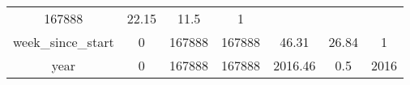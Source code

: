 \documentclass[]{book}
\theoremstyle{definition}
\theoremstyle{definition}
\theoremstyle{definition}
\theoremstyle{remark}
\begin{document}
\begin{longtable}[]{@{}ccccccc@{}}
\begin{minipage}[t]{0.10\columnwidth}
167888\strut
\end{minipage} & \begin{minipage}[t]{0.11\columnwidth}\centering\strut
22.15\strut
\end{minipage} & \begin{minipage}[t]{0.09\columnwidth}\centering\strut
11.5\strut
\end{minipage} & \begin{minipage}[t]{0.09\columnwidth}\centering\strut
1\strut
\end{minipage}\tabularnewline
\begin{minipage}[t]{0.20\columnwidth}\centering\strut
week\_since\_start\strut
\end{minipage} & \begin{minipage}[t]{0.11\columnwidth}\centering\strut
0\strut
\end{minipage} & \begin{minipage}[t]{0.12\columnwidth}\centering\strut
167888\strut
\end{minipage} & \begin{minipage}[t]{0.10\columnwidth}\centering\strut
167888\strut
\end{minipage} & \begin{minipage}[t]{0.11\columnwidth}\centering\strut
46.31\strut
\end{minipage} & \begin{minipage}[t]{0.09\columnwidth}\centering\strut
26.84\strut
\end{minipage} & \begin{minipage}[t]{0.09\columnwidth}\centering\strut
1\strut
\end{minipage}\tabularnewline
\begin{minipage}[t]{0.20\columnwidth}\centering\strut
year\strut
\end{minipage} & \begin{minipage}[t]{0.11\columnwidth}\centering\strut
0\strut
\end{minipage} & \begin{minipage}[t]{0.12\columnwidth}\centering\strut
167888\strut
\end{minipage} & \begin{minipage}[t]{0.10\columnwidth}\centering\strut
167888\strut
\end{minipage} & \begin{minipage}[t]{0.11\columnwidth}\centering\strut
2016.46\strut
\end{minipage} & \begin{minipage}[t]{0.09\columnwidth}\centering\strut
0.5\strut
\end{minipage} & \begin{minipage}[t]{0.09\columnwidth}\centering\strut
2016\strut
\end{minipage}\tabularnewline
\bottomrule
\end{longtable}
\end{document}
